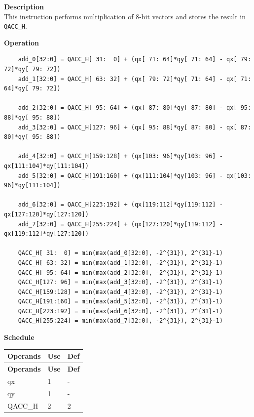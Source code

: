 \textbf{Description}\\
This instruction performs multiplication of 8-bit vectors and stores the result in \lstinline{QACC_H}.

\textbf{Operation}\\
\begin{lstlisting}
    add_0[32:0] = QACC_H[ 31:  0] + (qx[ 71: 64]*qy[ 71: 64] - qx[ 79: 72]*qy[ 79: 72])
    add_1[32:0] = QACC_H[ 63: 32] + (qx[ 79: 72]*qy[ 71: 64] - qx[ 71: 64]*qy[ 79: 72])

    add_2[32:0] = QACC_H[ 95: 64] + (qx[ 87: 80]*qy[ 87: 80] - qx[ 95: 88]*qy[ 95: 88])
    add_3[32:0] = QACC_H[127: 96] + (qx[ 95: 88]*qy[ 87: 80] - qx[ 87: 80]*qy[ 95: 88])

    add_4[32:0] = QACC_H[159:128] + (qx[103: 96]*qy[103: 96] - qx[111:104]*qy[111:104])
    add_5[32:0] = QACC_H[191:160] + (qx[111:104]*qy[103: 96] - qx[103: 96]*qy[111:104])

    add_6[32:0] = QACC_H[223:192] + (qx[119:112]*qy[119:112] - qx[127:120]*qy[127:120])
    add_7[32:0] = QACC_H[255:224] + (qx[127:120]*qy[119:112] - qx[119:112]*qy[127:120])

    QACC_H[ 31:  0] = min(max(add_0[32:0], -2^{31}), 2^{31}-1)
    QACC_H[ 63: 32] = min(max(add_1[32:0], -2^{31}), 2^{31}-1)
    QACC_H[ 95: 64] = min(max(add_2[32:0], -2^{31}), 2^{31}-1)
    QACC_H[127: 96] = min(max(add_3[32:0], -2^{31}), 2^{31}-1)
    QACC_H[159:128] = min(max(add_4[32:0], -2^{31}), 2^{31}-1)
    QACC_H[191:160] = min(max(add_5[32:0], -2^{31}), 2^{31}-1)
    QACC_H[223:192] = min(max(add_6[32:0], -2^{31}), 2^{31}-1)
    QACC_H[255:224] = min(max(add_7[32:0], -2^{31}), 2^{31}-1)

\end{lstlisting}

\textbf{Schedule}\\
\begin{longtable}[c]{|l|l|l|}
    \hline
    \rowcolor{lightgray}
    \textbf{Operands} & \textbf{Use} & \textbf{Def} \\\hline
    \endfirsthead
    \hline
    \rowcolor{lightgray}
     \textbf{Operands} & \textbf{Use} & \textbf{Def} \\\hline
    \endhead
    \hline
    \endfoot

     qx & 1 & - \\\hline
     qy & 1 & - \\\hline
     QACC\_H & 2 & 2

\end{longtable}

